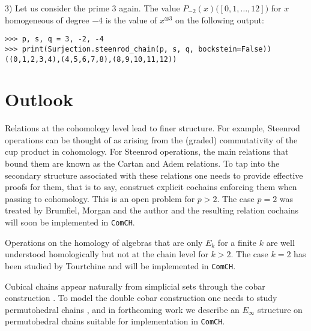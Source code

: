 \documentclass{amsart}
\newcommand{\comch}{\texttt{ComCH}}
\begin{document}
3) Let us consider the prime $3$ again.
The value $P_{-2}(x)\big([0,1,\dots,12]\big)$ for $x$ homogeneous of degree $-4$ is the value of $x^{\otimes 3}$ on the following output:

\begin{Verbatim}[frame=lines, samepage=true]
>>> p, s, q = 3, -2, -4
>>> print(Surjection.steenrod_chain(p, s, q, bockstein=False))
((0,1,2,3,4),(4,5,6,7,8),(8,9,10,11,12))
\end{Verbatim}

\section{Outlook}

Relations at the cohomology level lead to finer structure.
For example, Steenrod operations can be thought of as arising from the (graded) commutativity of the cup product in cohomology.
For Steenrod operations, the main relations that bound them are known as the Cartan and Adem relations.
To tap into the secondary structure associated with these relations one needs to provide effective proofs for them, that is to say, construct explicit cochains enforcing them when passing to cohomology.
This is an open problem for $p > 2$.
The case $p = 2$ was treated by Brumfiel, Morgan and the author \cite{medina2020cartan, medina2020adem} and the resulting relation cochains will soon be implemented in \comch.

Operations on the homology of algebras that are only $E_k$ for a finite $k$ are well understood homologically \cite{Cohen76} but not at the chain level for $k > 2$.
The case $k = 2$ has been studied by Tourtchine \cite{Tourtchine06} and will be implemented in \comch.

Cubical chains appear naturally from simplicial sets through the cobar construction \cite{adams1956cobar, Baues1980, medina2021cobar}.
To model the double cobar construction one needs to study permutohedral chains \cite{Kadeishvili2002}, and in forthcoming work we describe an $E_\infty$ structure on permutohedral chains suitable for implementation in \comch.


\end{document}
